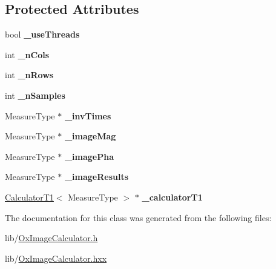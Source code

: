 \subsection*{Protected Attributes}
\begin{DoxyCompactItemize}
\item 
\hypertarget{class_ox_1_1_image_calculator_a00706fee617f4cdc79a9fe73d6eb7952}{bool {\bfseries \-\_\-use\-Threads}}\label{class_ox_1_1_image_calculator_a00706fee617f4cdc79a9fe73d6eb7952}

\item 
\hypertarget{class_ox_1_1_image_calculator_ad0907927d45dead403a6498832ecb049}{int {\bfseries \-\_\-n\-Cols}}\label{class_ox_1_1_image_calculator_ad0907927d45dead403a6498832ecb049}

\item 
\hypertarget{class_ox_1_1_image_calculator_ac2319d55027586587dcce5037bbea335}{int {\bfseries \-\_\-n\-Rows}}\label{class_ox_1_1_image_calculator_ac2319d55027586587dcce5037bbea335}

\item 
\hypertarget{class_ox_1_1_image_calculator_ae9cec673a9a41d5815ab6896e4aab667}{int {\bfseries \-\_\-n\-Samples}}\label{class_ox_1_1_image_calculator_ae9cec673a9a41d5815ab6896e4aab667}

\item 
\hypertarget{class_ox_1_1_image_calculator_ad41350f17edbddcbdfac509dd55aad78}{Measure\-Type $\ast$ {\bfseries \-\_\-inv\-Times}}\label{class_ox_1_1_image_calculator_ad41350f17edbddcbdfac509dd55aad78}

\item 
\hypertarget{class_ox_1_1_image_calculator_a786105c84dcfc7c925f99dbe78621332}{Measure\-Type $\ast$ {\bfseries \-\_\-image\-Mag}}\label{class_ox_1_1_image_calculator_a786105c84dcfc7c925f99dbe78621332}

\item 
\hypertarget{class_ox_1_1_image_calculator_a0ce3038054a2d3b25dbbbfe6c5f49c1b}{Measure\-Type $\ast$ {\bfseries \-\_\-image\-Pha}}\label{class_ox_1_1_image_calculator_a0ce3038054a2d3b25dbbbfe6c5f49c1b}

\item 
\hypertarget{class_ox_1_1_image_calculator_aceb024b74ea690ec91f9664c77e9914e}{Measure\-Type $\ast$ {\bfseries \-\_\-image\-Results}}\label{class_ox_1_1_image_calculator_aceb024b74ea690ec91f9664c77e9914e}

\item 
\hypertarget{class_ox_1_1_image_calculator_a5d173e644449d84a38bc11edc6235dbd}{\hyperlink{class_ox_1_1_calculator_t1}{Calculator\-T1}$<$ Measure\-Type $>$ $\ast$ {\bfseries \-\_\-calculator\-T1}}\label{class_ox_1_1_image_calculator_a5d173e644449d84a38bc11edc6235dbd}

\end{DoxyCompactItemize}


The documentation for this class was generated from the following files\-:\begin{DoxyCompactItemize}
\item 
lib/\hyperlink{_ox_image_calculator_8h}{Ox\-Image\-Calculator.\-h}\item 
lib/\hyperlink{_ox_image_calculator_8hxx}{Ox\-Image\-Calculator.\-hxx}\end{DoxyCompactItemize}
